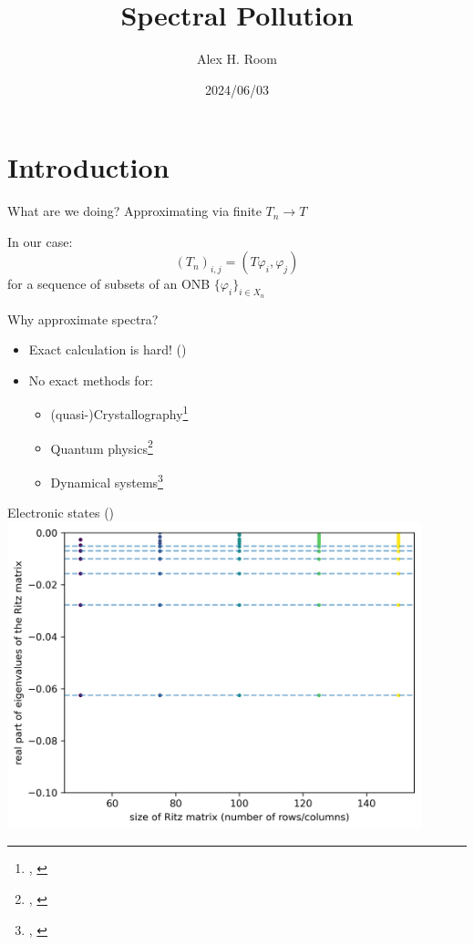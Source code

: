 \documentclass[14pt]{beamer}
\title{Spectral Pollution}
\author{Alex H. Room}
\date{2024/06/03}
\begin{document}
\begin{frame}
\titlepage
\end{frame}

\section{Introduction}
\begin{frame}{What are we doing?}
  \centering
  Approximating via finite $T_n \rightarrow T$

  In our case:
  $$(T_n)_{i,j} = (T \varphi_i, \varphi_j)$$
  for a sequence of subsets of an ONB $\{\varphi_i\}_{i \in X_n}$
  \end{frame}

\begin{frame}{Why approximate spectra?}
  \begin{itemize}
    \item Exact calculation is hard! (\textcite{arveson1993role})
    \item No exact methods for:
      \begin{itemize}
        \item (quasi-)Crystallography\footnote{\textcite{colbrook2019how}, \textcite{cances2012periodic}}
        \item Quantum physics\footnote{\textcite{pryce1993numerical}, \textcite{lewin2010spectral}}
        \item Dynamical systems\footnote{\textcite{servadio2022koopman}, \textcite{manning2008descriptor}}
      \end{itemize}
  \end{itemize}
\end{frame}

\begin{frame}{Electronic states (\textcite{pryce1993numerical})}
  \includegraphics[width=0.9\textwidth]{hydrogen}
\end{frame}
\end{document}
